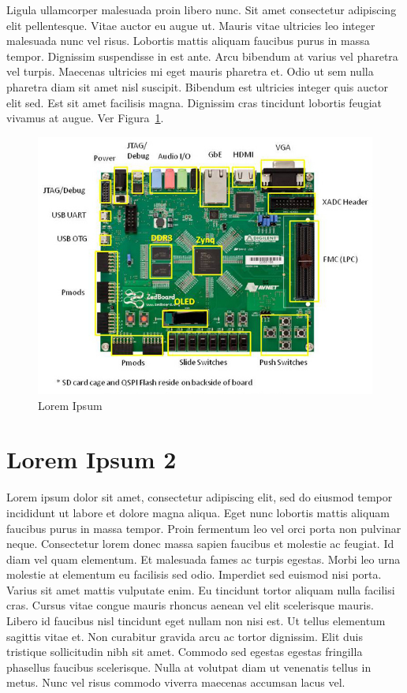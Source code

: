 \documentclass[a4paper,12pt,twoside,openright]{report}
\begin{document}
Ligula ullamcorper malesuada proin libero nunc. Sit amet consectetur adipiscing elit pellentesque. Vitae auctor eu augue ut. Mauris vitae ultricies leo integer malesuada nunc vel risus. Lobortis mattis aliquam faucibus purus in massa tempor. Dignissim suspendisse in est ante. Arcu bibendum at varius vel pharetra vel turpis. Maecenas ultricies mi eget mauris pharetra et. Odio ut sem nulla pharetra diam sit amet nisl suscipit. Bibendum est ultricies integer quis auctor elit sed. Est sit amet facilisis magna. Dignissim cras tincidunt lobortis feugiat vivamus at augue. Ver Figura~\ref{image1}.


\begin{figure}[H]
  \centering
    \includegraphics[scale=0.6]{figures/example_image.jpg}
  \caption{Lorem Ipsum}
  \label{image1}
\end{figure}





\chapter{Lorem Ipsum 2 \label{capitulodos}}

Lorem ipsum dolor sit amet, consectetur adipiscing elit, sed do eiusmod tempor incididunt ut labore et dolore magna aliqua. Eget nunc lobortis mattis aliquam faucibus purus in massa tempor. Proin fermentum leo vel orci porta non pulvinar neque. Consectetur lorem donec massa sapien faucibus et molestie ac feugiat. Id diam vel quam elementum. Et malesuada fames ac turpis egestas. Morbi leo urna molestie at elementum eu facilisis sed odio. Imperdiet sed euismod nisi porta. Varius sit amet mattis vulputate enim. Eu tincidunt tortor aliquam nulla facilisi cras. Cursus vitae congue mauris rhoncus aenean vel elit scelerisque mauris. Libero id faucibus nisl tincidunt eget nullam non nisi est. Ut tellus elementum sagittis vitae et. Non curabitur gravida arcu ac tortor dignissim. Elit duis tristique sollicitudin nibh sit amet. Commodo sed egestas egestas fringilla phasellus faucibus scelerisque. Nulla at volutpat diam ut venenatis tellus in metus. Nunc vel risus commodo viverra maecenas accumsan lacus vel.
\end{document}
